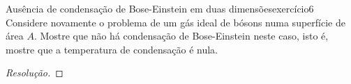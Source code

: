 \begin{exercício}{Ausência de condensação de Bose-Einstein em duas dimensões}{exercício6}
    Considere novamente o problema de um gás ideal de bósons numa superfície de área \(A\). Mostre que não há condensação de Bose-Einstein neste caso, isto é, mostre que a temperatura de condensação é nula.
\end{exercício}
\begin{proof}[Resolução]

\end{proof}
